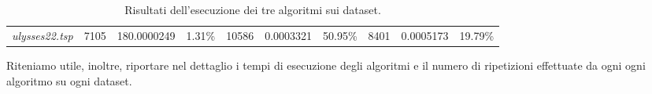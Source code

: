 \begin{landscape}
\begin{table}[]
\begin{tabular}{llllllllll}
  \textit{ulysses22.tsp}                                & 7105                                   & 180.0000249                                                                          & 1.31\%                                                                                 & 10586                                  & 0.0003321                                                                             & 50.95\%                                                                                & 8401                                   & 0.0005173                                                                            & 19.79\%                                                                               
  \end{tabular}
  \caption{Risultati dell'esecuzione dei tre algoritmi sui dataset.}
  \label{tab:results}
  \end{table}

\end{landscape}


Riteniamo utile, inoltre, riportare nel dettaglio i tempi di esecuzione degli algoritmi e il numero di ripetizioni effettuate da ogni ogni algoritmo su ogni dataset.

